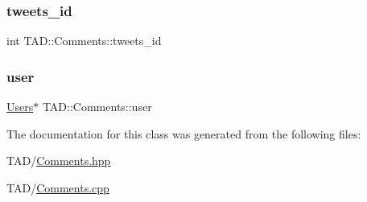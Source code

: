 \subsubsection{\texorpdfstring{tweets\+\_\+id}{tweets\_id}}
{\footnotesize\ttfamily int T\+A\+D\+::\+Comments\+::tweets\+\_\+id\hspace{0.3cm}{\ttfamily [private]}}

\mbox{\label{class_t_a_d_1_1_comments_a33d578ff96661f21cc9a6de37bb21256}} 
\subsubsection{\texorpdfstring{user}{user}}
{\footnotesize\ttfamily \hyperlink{class_t_a_d_1_1_users}{Users}$\ast$ T\+A\+D\+::\+Comments\+::user\hspace{0.3cm}{\ttfamily [private]}}



The documentation for this class was generated from the following files\+:\begin{DoxyCompactItemize}
\item 
T\+A\+D/\hyperlink{_comments_8hpp}{Comments.\+hpp}\item 
T\+A\+D/\hyperlink{_comments_8cpp}{Comments.\+cpp}\end{DoxyCompactItemize}
